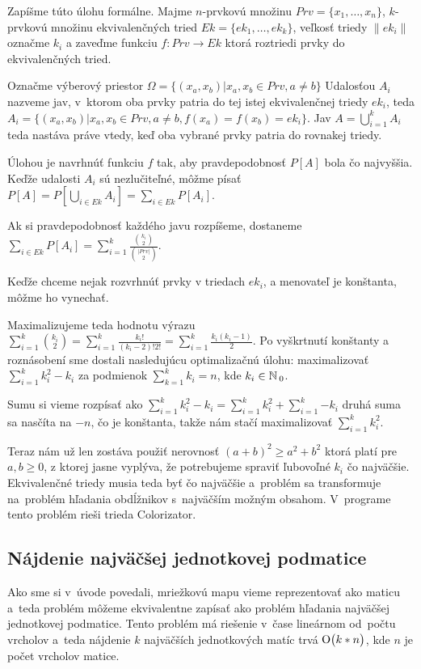 Zapíšme túto úlohu formálne. Majme $n$-prvkovú množinu $Prv = \{x_1,\ldots,x_n\}$, $k$-prvkovú množinu ekvivalenčných tried $Ek = \{ek_1,\ldots, ek_k\}$, veľkosť 
triedy $\|ek_i\|$ označme $k_i$ a zaveďme funkciu $f \colon Prv \to Ek$ ktorá roztriedi prvky do ekvivalenčných tried.

Označme výberový priestor $\Omega = \{(x_a, x_b) | x_a, x_b \in Prv, a \not= b \}$
Udalosťou $A_i$ nazveme jav, v~ktorom oba prvky patria do tej istej ekvivalenčnej triedy $ek_i$,
teda $A_i = \{(x_a, x_b) | x_a, x_b \in Prv, a \not= b, f(x_a) = f(x_b) = ek_i \}$.
Jav $A = \bigcup_{i=1}^{k} A_i$ teda nastáva práve vtedy,
 keď oba vybrané prvky patria do rovnakej triedy.

Úlohou je navrhnúť funkciu $f$ tak, aby pravdepodobnosť $P[A]$ bola čo najvyššia. 
Keďže udalosti $A_i$ sú nezlučiteľné, môžme písať 
$P[A] = P[\bigcup_{i \in Ek} A_i] = \sum_{i \in Ek}P[A_i]$.

Ak si pravdepodobnosť každého javu rozpíšeme, dostaneme 
$\sum_{i \in Ek}P[A_i] = \sum_{i = 1}^{k} \frac{{{k_i} \choose {2}}}{{{|Prv|} \choose {2}}}$.


Keďže chceme nejak rozvrhnúť prvky v triedach $ek_i$, a menovateľ je konštanta, môžme ho vynechať.

Maximalizujeme teda hodnotu výrazu 
$\sum_{i = 1}^{k} {{k_i} \choose {2}} = \sum_{i = 1}^{k} {\frac{k_i!}{(k_i -2 )!2!}} = \sum_{i = 1}^{k}{\frac{k_i (k_i-1)}{2}}$.
Po vyškrtnutí konštanty a roznásobení sme dostali nasledujúcu optimalizačnú úlohu:
maximalizovať $\sum_{i = 1}^{k} {k_i^2 - k_i}$ za podmienok $\sum_{k=1}^{k}k_i = n$,
kde $k_i \in \mathbb{N}\,_0$.

Sumu si vieme rozpísať ako 
$\sum_{i = 1}^{k} {k_i^2 - k_i} = \sum_{i = 1}^{k} {k_i^2} + \sum_{i = 1}^{k}{-k_i}$
druhá suma sa nasčíta na $-n$, čo je konštanta, takže nám stačí maximalizovať 
$\sum_{i = 1}^{k} {k_i^2}$.

Teraz nám už len zostáva použiť nerovnosť
$(a+b)^2 \geq a^2 + b^2$ ktorá platí pre $a,b \geq 0$, z ktorej jasne vyplýva, že potrebujeme spraviť ľubovoľné $k_i$ čo najväčšie.
Ekvivalenčné triedy musia teda byť čo najväčšie a~problém sa transformuje na~problém hľadania
obdĺžnikov s~najväčším možným obsahom.
V~programe tento problém rieši trieda Colorizator.


\subsection{Nájdenie najväčšej jednotkovej podmatice}
Ako sme si v~úvode povedali, mriežkovú mapu vieme reprezentovať ako maticu a~teda
problém môžeme ekvivalentne zapísať ako problém hľadania najväčšej jednotkovej podmatice.
Tento problém má riešenie v~čase lineárnom od~počtu vrcholov a~teda nájdenie $k$ najväčších
jednotkových matíc trvá $\operatorname{O}\bigl(k*n\bigr)$, kde $n$ je počet vrcholov matice.

